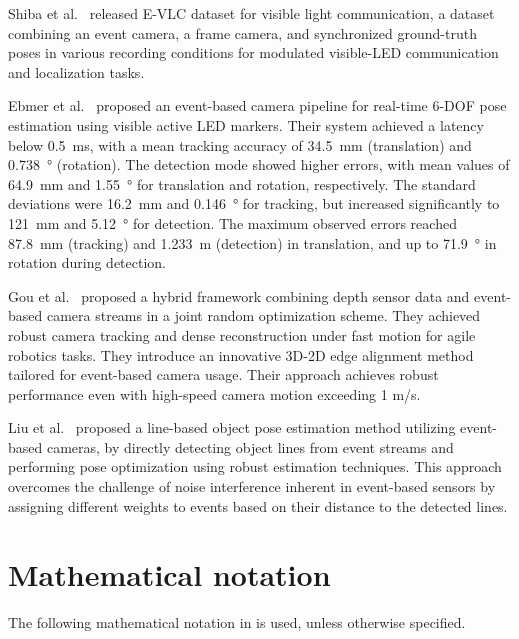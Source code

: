 Shiba et al.~\cite{Shiba25cvprw} released E-VLC dataset for visible light communication, a dataset combining an event camera, a frame camera, and synchronized ground-truth poses in various recording conditions for modulated visible-\ac{LED} communication and localization tasks.

Ebmer et al.~\cite{ebmer2023} proposed an event-based camera pipeline for real-time 6-\ac{DOF} pose estimation using visible active LED markers. Their system achieved a latency below \SI{0.5}{\milli\second}, with a mean tracking accuracy of \SI{34.5}{\milli\meter} (translation) and \SI{0.738}{\degree} (rotation). The detection mode showed higher errors, with mean values of \SI{64.9}{\milli\meter} and \SI{1.55}{\degree} for translation and rotation, respectively. The standard deviations were \SI{16.2}{\milli\meter} and \SI{0.146}{\degree} for tracking, but increased significantly to \SI{121}{\milli\meter} and \SI{5.12}{\degree} for detection. The maximum observed errors reached \SI{87.8}{\milli\meter} (tracking) and \SI{1.233}{\meter} (detection) in translation, and up to \SI{71.9}{\degree} in rotation during detection.

Gou et al.~\cite{GOU2025328} proposed a hybrid framework combining depth sensor data and event-based camera streams in a joint random optimization scheme. They achieved robust camera tracking and dense reconstruction under fast motion for agile robotics tasks.
They introduce an innovative 3D-2D edge alignment method tailored for event-based camera usage. Their approach achieves
robust performance even with high-speed camera motion exceeding 1 m/s.

Liu et al.~\cite{liu2024linebased6dofobjectpose} proposed a line-based object pose estimation method utilizing event-based cameras, 
by directly detecting object lines from event streams and performing pose optimization using robust estimation techniques.
This approach overcomes the challenge of noise interference inherent in event-based sensors by assigning different weights to events
based on their distance to the detected lines.
\section{Mathematical notation}

The following mathematical notation in  is used, unless otherwise specified.

